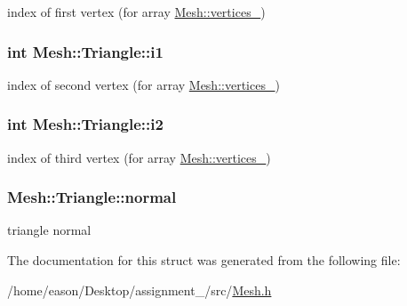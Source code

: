 index of first vertex (for array \hyperlink{classMesh_a986edf1ab1d37e517ff8adc928519528}{Mesh\+::vertices\+\_\+}) 

\subsubsection[{\texorpdfstring{i1}{i1}}]{\setlength{\rightskip}{0pt plus 5cm}int Mesh\+::\+Triangle\+::i1}\hypertarget{structMesh_1_1Triangle_afc583a0169089f8a73367a31cec7bc39}{}\label{structMesh_1_1Triangle_afc583a0169089f8a73367a31cec7bc39}


index of second vertex (for array \hyperlink{classMesh_a986edf1ab1d37e517ff8adc928519528}{Mesh\+::vertices\+\_\+}) 

\subsubsection[{\texorpdfstring{i2}{i2}}]{\setlength{\rightskip}{0pt plus 5cm}int Mesh\+::\+Triangle\+::i2}\hypertarget{structMesh_1_1Triangle_ae123132ba821ea91e4a9fb12349bd4ea}{}\label{structMesh_1_1Triangle_ae123132ba821ea91e4a9fb12349bd4ea}


index of third vertex (for array \hyperlink{classMesh_a986edf1ab1d37e517ff8adc928519528}{Mesh\+::vertices\+\_\+}) 

\subsubsection[{\texorpdfstring{normal}{normal}}]{ Mesh\+::\+Triangle\+::normal}\hypertarget{structMesh_1_1Triangle_a697c3d7e2f4a316e7b486e048efff56d}{}\label{structMesh_1_1Triangle_a697c3d7e2f4a316e7b486e048efff56d}


triangle normal 



The documentation for this struct was generated from the following file\+:\begin{DoxyCompactItemize}
\item 
/home/eason/\+Desktop/assignment\+\_/src/\hyperlink{Mesh_8h}{Mesh.\+h}\end{DoxyCompactItemize}
